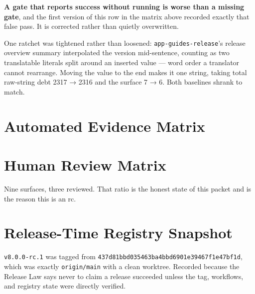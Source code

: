 \begin{enumerate}
  \textbf{A gate that reports success without running is worse than a missing gate}, and the first version of this row in the matrix above recorded exactly that false pass. It is corrected rather than quietly overwritten.
\end{enumerate}

One ratchet was tightened rather than loosened: \texttt{a\allowbreak{}p\allowbreak{}p\allowbreak{}-\allowbreak{}g\allowbreak{}u\allowbreak{}i\allowbreak{}d\allowbreak{}e\allowbreak{}s\allowbreak{}-\allowbreak{}r\allowbreak{}e\allowbreak{}l\allowbreak{}e\allowbreak{}a\allowbreak{}s\allowbreak{}e}'s release overview summary interpolated the version mid-sentence, counting as two translatable literals split around an inserted value --- word order a translator cannot rearrange. Moving the value to the end makes it one string, taking total raw-string debt 2317 → 2316 and the surface 7 → 6. Both baselines shrank to match.

\section{Automated Evidence Matrix}\label{record-262-automated-evidence-matrix}



\section{Human Review Matrix}\label{record-262-human-review-matrix}



Nine surfaces, three reviewed. That ratio is the honest state of this packet and is the reason this is an rc.

\section{Release-Time Registry Snapshot}\label{record-262-release-time-registry-snapshot}

\texttt{v\allowbreak{}8\allowbreak{}.\allowbreak{}0\allowbreak{}.\allowbreak{}0\allowbreak{}-\allowbreak{}r\allowbreak{}c\allowbreak{}.\allowbreak{}1} was tagged from \texttt{4\allowbreak{}3\allowbreak{}7\allowbreak{}d\allowbreak{}8\allowbreak{}1\allowbreak{}b\allowbreak{}b\allowbreak{}d\allowbreak{}0\allowbreak{}3\allowbreak{}5\allowbreak{}4\allowbreak{}6\allowbreak{}3\allowbreak{}b\allowbreak{}a\allowbreak{}4\allowbreak{}b\allowbreak{}b\allowbreak{}d\allowbreak{}6\allowbreak{}9\allowbreak{}0\allowbreak{}1\allowbreak{}e\allowbreak{}3\allowbreak{}9\allowbreak{}4\allowbreak{}6\allowbreak{}7\allowbreak{}f\allowbreak{}1\allowbreak{}e\allowbreak{}4\allowbreak{}7\allowbreak{}b\allowbreak{}f\allowbreak{}1\allowbreak{}d}, which was exactly \texttt{o\allowbreak{}r\allowbreak{}i\allowbreak{}g\allowbreak{}i\allowbreak{}n\allowbreak{}/\allowbreak{}m\allowbreak{}a\allowbreak{}i\allowbreak{}n} with a clean worktree. Recorded because the Release Law says never to claim a release succeeded unless the tag, workflows, and registry state were directly verified.

